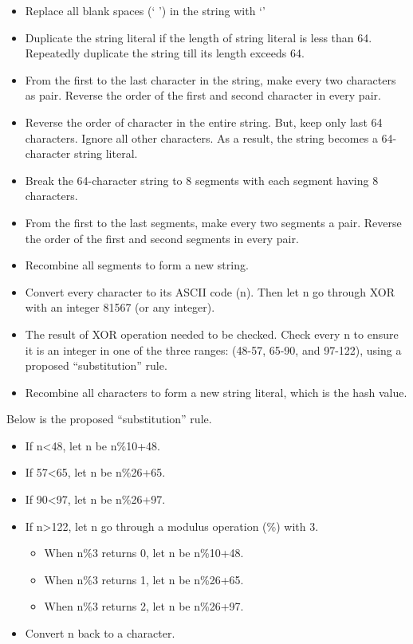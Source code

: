 \documentclass{article}
\begin{document}
\begin{itemize}
    \item Replace all blank spaces (` ') in the string with `\textdollar{}' 
    \item Duplicate the string literal if the length of string literal is less than 64. Repeatedly duplicate the string till its length exceeds 64.
    \item From the first to the last character in the string, make every two characters as pair. Reverse the order of the first and second character in every pair.
    \item Reverse the order of character in the entire string. But, keep only last 64 characters. Ignore all other characters. As a result, the string becomes a 64-character string literal.
    \item Break the 64-character string to 8 segments with each segment having 8 characters.
    \item From the first to the last segments, make every two segments a pair. Reverse the order of the first and second segments in every pair.
    \item Recombine all segments to form a new string.
    \item Convert every character to its ASCII code (n). Then let n go through XOR with an integer 81567 (or any integer).
    \item The result of XOR operation needed to be checked. Check every n to ensure it is an integer in one of the three ranges: (48-57, 65-90, and 97-122), using a proposed \textquotedblleft{}substitution\textquotedblright{} rule.
    \item Recombine all characters to form a new string literal, which is the hash value.
\end{itemize}

Below is the proposed ``substitution'' rule.

\begin{itemize}
    \item If n\textless{}48, let n be n\%10+48. 
    \item If 57\textless{}65, let n be n\%26+65. 
    \item If 90\textless{}97, let n be n\%26+97.
    \item If n\textgreater{}122, let n go through a modulus operation (\%) with 3. 
\begin{itemize}
    \item When n\%3 returns 0, let n be n\%10+48. 
    \item When n\%3 returns 1, let n be n\%26+65. 
    \item When n\%3 returns 2, let n be n\%26+97. 
\end{itemize}

    \item Convert n back to a character.
\end{itemize}
\end{document}
